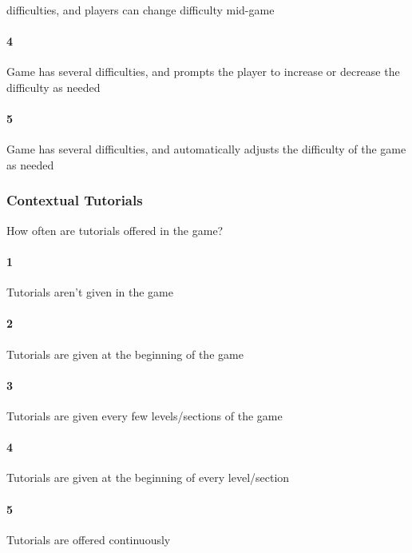 difficulties, and players can change difficulty mid-game\paragraph{4}Game has several difficulties, and prompts the player to increase or decrease the difficulty as needed\paragraph{5}Game has several difficulties, and automatically adjusts the difficulty of the game as needed\subsubsection{Contextual Tutorials}How often are tutorials offered in the game?\paragraph{1}Tutorials aren't given in the game\paragraph{2}Tutorials are given at the beginning of the game\paragraph{3}Tutorials are given every few levels/sections of the game\paragraph{4}Tutorials are given at the beginning of every level/section\paragraph{5}Tutorials are offered continuously